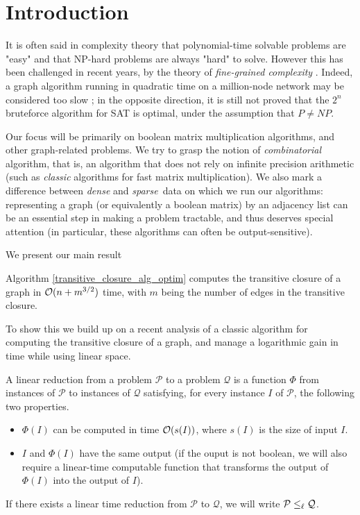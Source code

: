 
\section{Introduction}
It is often said in complexity theory that polynomial-time 
solvable problems are "easy" and that NP-hard problems are always
"hard" to solve. However this has been challenged in recent
years, by the theory of \emph{fine-grained complexity} \cite{borassi2015into,
vassilevskawilliams:LIPIcs:2015:5568}.
Indeed, a graph algorithm running in quadratic time on a 
million-node network may be considered too slow ;
in the opposite direction, it is still not proved that the $2^n$ bruteforce
 algorithm
for SAT is optimal, under the assumption that $P \neq NP$.


Our focus will be primarily on boolean matrix multiplication algorithms, and
other graph-related problems. We try to grasp the notion of \emph{combinatorial}
algorithm, that is, an algorithm that does not rely on infinite precision
arithmetic (such as \emph{classic} algorithms for fast matrix 
multiplication). We also mark a difference between \emph{dense} and 
\emph{sparse} data on which we run our algorithms: representing a graph
(or equivalently a boolean matrix) by an adjacency list can be an 
essential step in making a problem tractable, and thus deserves special
attention (in particular, these algorithms can often be 
output-sensitive).

We present our main result
\begin{Theo}
\label{quick_trans}
Algorithm \ref{transitive_closure_alg_optim} computes the transitive closure
of a graph in $\mathcal O(n+m^{3/2})$ time, with $m$ being the number of edges
in the transitive closure.
\end{Theo}
To show this we build up on a recent analysis of a classic algorithm for
computing the 
transitive closure of a graph, and manage a logarithmic gain in  time while
 using linear space.

\begin{Def}
A linear reduction from a problem $\mathcal P$ to a problem
$\mathcal Q$ is a function $\Phi$ from instances of $\mathcal P$
to instances of $\mathcal Q$ satisfying, for every instance $I$ of
$\mathcal P$, the following two properties.
\begin{itemize}
\item $\Phi(I)$ can be computed in time $\mathcal O(s(I))$, where $s(I)$
is the size of input $I$.
\item $I$ and $\Phi(I)$ have the same output (if the ouput is not boolean,
we will also require a linear-time computable function that transforms
the output of $\Phi(I)$ into the output of $I$).
\end{itemize}
If there exists a linear time reduction from $\mathcal P$ to
$\mathcal Q$, we will write $\mathcal P \leq_{\ell} \mathcal Q$.
\end{Def}


